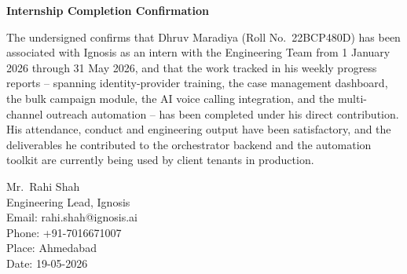 \thispagestyle{plain}
\begin{center}
{\Large \bf Internship Completion Confirmation}
\end{center}
\vspace{0.6cm}

\begin{justify}
The undersigned confirms that Dhruv Maradiya (Roll No.\ 22BCP480D) has been associated with Ignosis as an intern with the Engineering Team from 1 January 2026 through 31 May 2026, and that the work tracked in his weekly progress reports -- spanning identity-provider training, the case management dashboard, the bulk campaign module, the AI voice calling integration, and the multi-channel outreach automation -- has been completed under his direct contribution. His attendance, conduct and engineering output have been satisfactory, and the deliverables he contributed to the orchestrator backend and the automation toolkit are currently being used by client tenants in production.
\end{justify}

\vspace{2.5cm}

\noindent
Mr.~Rahi Shah\\
Engineering Lead, Ignosis\\
Email: rahi.shah@ignosis.ai\\
Phone: +91-7016671007\\[0.6cm]

\noindent
Place: Ahmedabad\\[0.3cm]
Date: 19-05-2026

\clearpage
